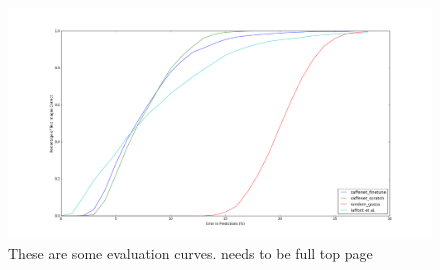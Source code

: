 \documentclass{article}
\begin{document}
\begin{figure}[t]
	\centering
		\includegraphics[width=1.0\textwidth]{figs/fig_1.png}
		\caption{These are some evaluation curves. needs to be full top page}
\end{figure}

%
%
\end{document}
